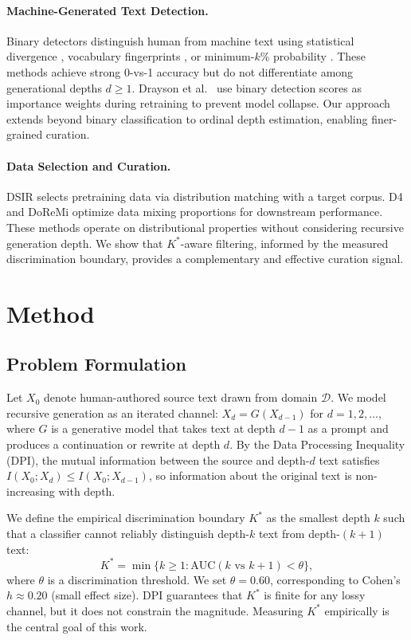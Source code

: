 \documentclass[11pt,a4paper]{article}
\newcommand{\Kstar}{K^{*}}
\begin{document}
\paragraph{Machine-Generated Text Detection.}
Binary detectors distinguish human from machine text using statistical divergence \cite{mitchell2023detectgpt}, vocabulary fingerprints \cite{bao2024diveye}, or minimum-$k$\% probability \cite{shi2024minkpp}. These methods achieve strong 0-vs-1 accuracy but do not differentiate among generational depths $d \geq 1$. Drayson et al.~\cite{drayson2025} use binary detection scores as importance weights during retraining to prevent model collapse. Our approach extends beyond binary classification to ordinal depth estimation, enabling finer-grained curation.

\paragraph{Data Selection and Curation.}
DSIR \cite{xie2023dsir} selects pretraining data via distribution matching with a target corpus. D4 \cite{tirumala2024d4} and DoReMi \cite{xie2024doremi} optimize data mixing proportions for downstream performance. These methods operate on distributional properties without considering recursive generation depth. We show that $\Kstar$-aware filtering, informed by the measured discrimination boundary, provides a complementary and effective curation signal.

\section{Method}

\subsection{Problem Formulation}

Let $X_0$ denote human-authored source text drawn from domain $\mathcal{D}$. We model recursive generation as an iterated channel: $X_d = G(X_{d-1})$ for $d = 1, 2, \ldots$, where $G$ is a generative model that takes text at depth $d{-}1$ as a prompt and produces a continuation or rewrite at depth $d$. By the Data Processing Inequality (DPI), the mutual information between the source and depth-$d$ text satisfies $I(X_0; X_d) \leq I(X_0; X_{d-1})$, so information about the original text is non-increasing with depth.

We define the empirical discrimination boundary $\Kstar$ as the smallest depth $k$ such that a classifier cannot reliably distinguish depth-$k$ text from depth-$(k{+}1)$ text:
\begin{equation}
\Kstar = \min \{ k \geq 1 : \text{AUC}(k \text{ vs } k{+}1) < \theta \},
\end{equation}
where $\theta$ is a discrimination threshold. We set $\theta = 0.60$, corresponding to Cohen's $h \approx 0.20$ (small effect size). DPI guarantees that $\Kstar$ is finite for any lossy channel, but it does not constrain the magnitude. Measuring $\Kstar$ empirically is the central goal of this work.
\end{document}
